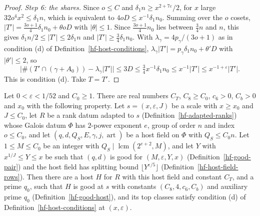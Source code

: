 \begin{proof}
\emph{Step 6: the shares.} Since $o\leq C$ and $\delta_1n\geq x^{2+7\varepsilon}/2$, for $x$ large
$32o^4x^2\leq\delta_1n$, which is equivalent to $4oD\leq x^{-1}\delta_1n_0$. Summing over the $o$
cosets, $|T'|=\frac{3o+1}4\delta_1n_0+\theta oD$ with $|\theta|\leq1$. Since
$\frac{3o+1}{4}n_0$ lies between $\frac34n$ and $n$, this gives $\delta_1n/2\leq|T'|\leq2\delta_1n$
and $|T'|\geq\frac34\delta_1n_0$. With $\lambda_\gamma=4p_\gamma/(3o+1)$ as in condition (d) of
Definition~\ref{hf-host-conditions}, $\lambda_\gamma|T'|=p_\gamma\delta_1n_0+\theta'D$ with
$|\theta'|\leq2$, so
\[
 \bigl|\#(T'\cap(\gamma+A_0))-\lambda_\gamma|T'|\bigr|\leq3D\leq\tfrac34x^{-1}\delta_1n_0\leq
 x^{-1}|T'|\leq x^{-1+\varepsilon}|T'|.
\]
This is condition (d). Take $T=T'$.
\end{proof}

\begin{theorem}\label{hf-good-host-exists}
Let $0<\varepsilon<1/52$ and $C_0\geq1$. There are real numbers $C_T$, $C_8\geq C_0$, $c_6>0$,
$C_b>0$ and $x_0$ with the following property. Let $s=(x,\varepsilon,J)$ be a scale with $x\geq x_0$
and $J\leq C_0$, let $R$ be a rank datum adapted to $s$ (Definition~\ref{hf-adapted-ranks}) whose Galois datum
$\Phi$ has $2$-power exponent $e$, group of order $n$ and index $o\leq C_0$, and let
$(q,d,Q_S,E,\gamma,j,\operatorname{art})$ be a host field on $\Phi$ with $Q_S\leq C_0n$. Let
$1\leq M\leq C_0$ be an integer with $Q_S\mid\operatorname{lcm}(2^{e+2},M)$, and let $Y$ with
$x^{1/J}\leq Y\leq x$ be such that $(q,d)$ is good for $(M,\varepsilon,Y,x)$
(Definition~\ref{hf-good-pair}) and the host field has splitting bound
$\lfloor Y^{\varepsilon/5}\rfloor$ (Definition~\ref{hf-host-field-rows}). Then there are a host $H$
for $R$ with this host field and constant $C_T$, and a prime $q_0$, such that $H$ is good at $s$
with constants $(C_8,4,c_6,C_b)$ and auxiliary prime $q_0$ (Definition~\ref{hf-good-host}), and its
top classes satisfy condition (d) of Definition~\ref{hf-host-conditions} at $(x,\varepsilon)$.
\end{theorem}

